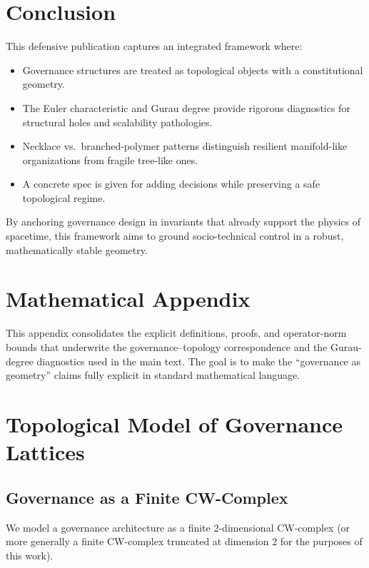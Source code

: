 \documentclass[11pt]{article}
\begin{document}
\section{Conclusion}

This defensive publication captures an integrated framework where:
\begin{itemize}
  \item Governance structures are treated as topological objects with a constitutional geometry.
  \item The Euler characteristic and Gurau degree provide rigorous diagnostics for structural holes and scalability pathologies.
  \item Necklace vs.\ branched-polymer patterns distinguish resilient manifold-like organizations from fragile tree-like ones.
  \item A concrete spec is given for adding decisions while preserving a safe topological regime.
\end{itemize}

By anchoring governance design in invariants that already support the physics of spacetime, this framework aims to ground socio-technical control in a robust, mathematically stable geometry.

\appendix
\section*{Mathematical Appendix}

This appendix consolidates the explicit definitions, proofs, and operator-norm bounds that underwrite the governance–topology correspondence and the Gurau-degree diagnostics used in the main text. The goal is to make the “governance as geometry” claims fully explicit in standard mathematical language.

\section{Topological Model of Governance Lattices}

\subsection{Governance as a Finite CW-Complex}

We model a governance architecture as a finite 2-dimensional CW-complex (or more generally a finite CW-complex truncated at dimension 2 for the purposes of this work).
\end{document}
